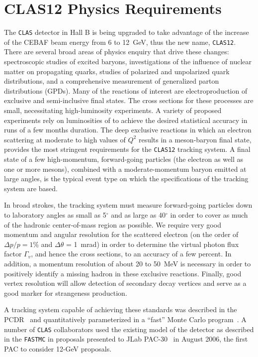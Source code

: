 
\section{CLAS12 Physics Requirements}

The {\tt CLAS} detector in Hall B is being upgraded to take advantage 
of the increase of the CEBAF beam energy from 6 to 12~GeV, thus the 
new name, {\tt CLAS12}.  There are several broad areas of physics 
enquiry that drive these changes: spectroscopic studies of excited 
baryons, investigations of the influence of nuclear matter on propagating 
quarks, studies of polarized and unpolarized quark distributions, and a 
comprehensive measurement of generalized parton distributions (GPDs).  
Many of the reactions of interest are electroproduction of exclusive and 
semi-inclusive final states.  The cross sections for these processes are 
small, necessitating high-luminosity experiments.  A variety of proposed 
experiments rely on luminosities of  to achieve the desired statistical 
accuracy in runs of a few months duration.  The deep exclusive reactions in 
which an electron scattering at moderate to high values of $Q^2$ results in 
a meson-baryon final state, provides the most stringent requirements for 
the {\tt CLAS12} tracking system.  A final state of a few high-momentum, 
forward-going particles (the electron as well as one or more mesons), 
combined with a moderate-momentum baryon emitted at large angles, is the 
typical event type on which the specifications of the tracking system are 
based.  

In broad strokes, the tracking system must measure forward-going particles 
down to laboratory angles as small as 5$^{\circ}$ and as large as 
40$^{\circ}$ in order to cover as much of the hadronic center-of-mass 
region as possible.  We require very good momentum and angular resolution 
for the scattered electron (on the order of $\Delta p/p = 1\%$ and 
$\Delta \theta$ = 1~mrad) in order to determine the virtual photon flux 
factor $\Gamma_v$, and hence the cross sections, to an accuracy of a few 
percent.  In addition, a momentum resolution of about 20 to 50~MeV is 
necessary in order to positively identify a missing hadron in these 
exclusive reactions.  Finally, good vertex resolution will allow detection 
of secondary decay vertices and serve as a good marker for strangeness 
production.

A tracking system capable of achieving these standards was described
in the PCDR~\cite{pcdr} and quantitatively parameterized in a ``fast'' 
Monte Carlo program~\cite{fastmc}.  A number of {\tt CLAS} collaborators 
used the existing model of the detector as described in the {\tt FASTMC} 
in proposals presented to JLab PAC-30~\cite{pac} in August 2006, the 
first PAC to consider 12-GeV proposals.

